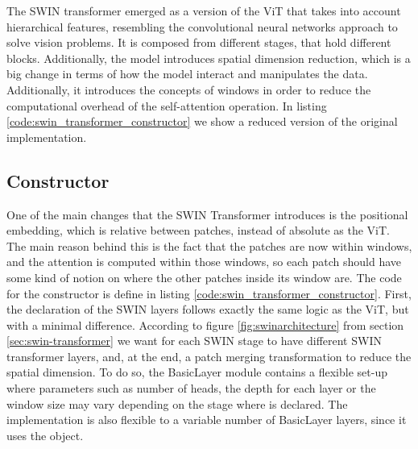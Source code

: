 The SWIN transformer emerged as a version of the ViT that takes into account hierarchical features, resembling the convolutional neural networks approach to solve vision problems. It is composed from different stages, that hold different blocks. Additionally, the model introduces spatial dimension reduction, which is a big change in terms of how the model interact and manipulates the data. Additionally, it introduces the concepts of windows in order to reduce the computational overhead of the self-attention operation. In listing \ref{code:swin_transformer_constructor} we show a reduced version of the original implementation. 

\subsection{Constructor}
One of the main changes that the SWIN Transformer introduces is the positional embedding, which is relative between patches, instead of absolute as the ViT. The main reason behind this is the fact that the patches are now within windows, and the attention is computed within those windows, so each patch should have some kind of notion on where the other patches inside its window are. The code for the constructor is define in listing \ref{code:swin_transformer_constructor}. First, the declaration of the SWIN layers follows exactly the same logic as the ViT, but with a minimal difference. According to figure \ref{fig:swinarchitecture} from section \ref{sec:swin-transformer} we want for each SWIN stage to have different SWIN transformer layers, and, at the end, a patch merging transformation to reduce the spatial dimension. To do so, the BasicLayer module contains a flexible set-up where parameters such as number of heads, the depth for each layer or the window size may vary depending on the stage where is declared. The implementation is also flexible to a variable number of BasicLayer layers, since it uses the  object.

